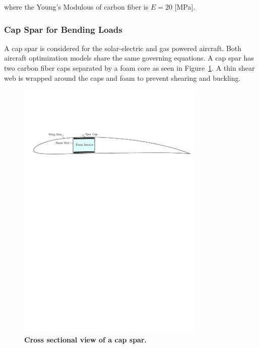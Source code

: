 where the Young's Modulous of carbon fiber is $E = 20$ [MPa]. 

\subsubsection{Cap Spar for Bending Loads}

A cap spar is considered for the solar-electric and gas powered aircraft.  Both aircraft optimization models share the same governing equations.  A cap spar has two carbon fiber caps separated by a foam core as seen in Figure~\ref{f:capspar}. A thin shear web is wrapped around the caps and foam to prevent shearing and buckling.

\begin{figure}[H]
	\begin{center}
	\DIFdelbeginFL %
\DIFdelendFL \DIFaddbeginFL \includegraphics[width=0.8\textwidth,natwidth=3242,natheight=1195]{capsparcross.pdf}
    \DIFaddendFL \caption{\textbf{Cross sectional view of a cap spar.}}
	\label{f:capspar}
	\end{center}
\end{figure}

